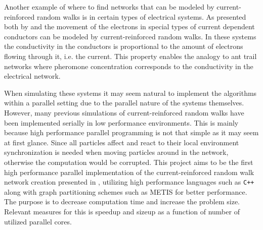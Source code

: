 Another example of where to find networks that can be modeled by current-reinforced random walks is in certain types of electrical systems. As presented both by \citep{Current} and \cite{Doyle} the movement of the electrons in special types of current dependent conductors can be modeled by current-reinforced random walks. In these systems the conductivity in the conductors is proportional to the amount of electrons flowing through it, i.e. the current. This property enables the analogy to ant trail networks where pheromone concentration corresponds to the conductivity in the electrical network.

When simulating these systems it may seem natural to implement the algorithms within a parallel setting due to the parallel nature of the systems themselves. However, many previous simulations of current-reinforced random walks have been implemented serially in low performance environments. This is mainly because high performance parallel programming is not that simple as it may seem at first glance. Since all particles affect and react to their local environment synchronization is needed when moving particles around in the network, otherwise the computation would be corrupted. This project aims to be the first high performance parallel implementation of the current-reinforced random walk network creation presented in \cite{Current}, utilizing high performance languages such as \texttt{C++} along with graph partitioning schemes such as METIS for better performance. The purpose is to decrease computation time and increase the problem size. Relevant measures for this is speedup and sizeup as a function of number of utilized parallel cores.
